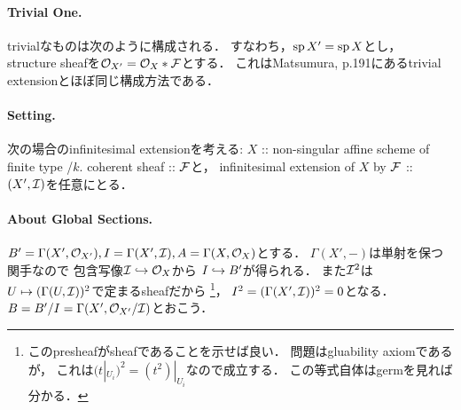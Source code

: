 \documentclass[a4paper]{jsarticle}
\begin{document}
    \paragraph{Trivial One.}
    trivialなものは次のように構成される．
    すなわち，$\operatorname{sp} X'=\operatorname{sp} X$とし，
    structure sheafを$\mathcal{O}_{X'}=\mathcal{O}_X \ast \mathcal{F}$とする．
    これはMatsumura, p.191にあるtrivial extensionとほぼ同じ構成方法である．

    \paragraph{Setting.}
    次の場合のinfinitesimal extensionを考える:
    $X$ :: non-singular affine scheme of finite type /$k$.
    coherent sheaf :: $\mathcal{F}$と，
    infinitesimal extension of $X$ by $\mathcal{F}$ :: $(X', \mathcal{I})$を任意にとる．

    \paragraph{About Global Sections.}
    $B'=\Gamma(X', \mathcal{O}_{X'}), I=\Gamma(X', \mathcal{I}), A=\Gamma(X, \mathcal{O}_X)$とする．
    $\Gamma(X',-)$は単射を保つ関手なので
    包含写像$\mathcal{I} \hookrightarrow \mathcal{O}_X$から
    $I \hookrightarrow B'$が得られる．
    また$\mathcal{I}^2$は$U \mapsto (\Gamma(U, \mathcal{I}))^2$で定まるsheafだから
    \footnote
    {
        このpresheafがsheafであることを示せば良い．
        問題はgluability axiomであるが，
        これは$(t|_{U_i})^2=(t^2)|_{U_i}$なので成立する．
        この等式自体はgermを見れば分かる．
    }，
    $I^2=(\Gamma(X', \mathcal{I}))^2=0$となる．
    $B=B'/I=\Gamma(X', \mathcal{O}_{X'}/\mathcal{I})$とおこう．
\end{document}
